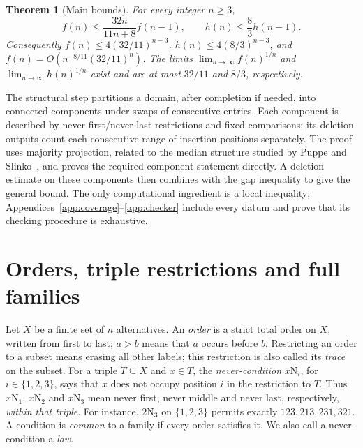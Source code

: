 \documentclass[11pt,letterpaper]{article}
\newtheorem{theorem}{Theorem}[section]
\theoremstyle{definition}
\newcommand{\N}[2]{#1\mathrm N_{#2}}
\begin{document}
\begin{theorem}[Main bounds]\label{thm:main}
For every integer \(n\geq3\),
\[
 f(n)\leq\frac{32n}{11n+8}f(n-1),\qquad
 h(n)\leq\frac83h(n-1).
\]
Consequently \(f(n)\leq4(32/11)^{n-3}\),
\(h(n)\leq4(8/3)^{n-3}\), and
\(f(n)=O(n^{-8/11}(32/11)^n)\).
The limits \(\lim_{n\to\infty}f(n)^{1/n}\) and
\(\lim_{n\to\infty}h(n)^{1/n}\) exist and are at most \(32/11\)
and \(8/3\), respectively.
\end{theorem}

The structural step partitions a domain, after completion if needed,
into connected components under swaps of consecutive entries.
Each component is described by never-first/never-last restrictions and
fixed comparisons; its deletion outputs count each consecutive range
of insertion positions separately. The proof uses majority projection, related to the median
structure studied by Puppe and Slinko~\cite{PuppeSlinko}, and proves the
required component statement directly. A deletion estimate on these
components then combines with the gap inequality to give the general
bound. The only computational ingredient is a local inequality;
Appendices~\ref{app:coverage}--\ref{app:checker} include every datum and
prove that its checking procedure is exhaustive.

\clearpage
\section{Orders, triple restrictions and full families}\label{sec:objects}
Let \(X\) be a finite set of \(n\) alternatives. An \emph{order} is
a strict total order on \(X\), written from first to last; \(a>b\)
means that \(a\) occurs before \(b\). Restricting
an order to a subset means erasing all other labels; this restriction is
also called its \emph{trace} on the subset.
For a triple \(T\subseteq X\) and \(x\in T\), the \emph{never-condition}
\(\N{x}{i}\), for \(i\in\{1,2,3\}\), says that \(x\) does not occupy position \(i\) in the
restriction to \(T\). Thus \(\N{x}{1}\), \(\N{x}{2}\) and
\(\N{x}{3}\) mean never first, never middle and never last,
respectively, \emph{within that triple}. For instance, \(\N23\) on
\(\{1,2,3\}\) permits exactly \(123,213,231,321\).
A condition is \emph{common} to a family if every order satisfies it.
We also call a never-condition a \emph{law}.
\end{document}
